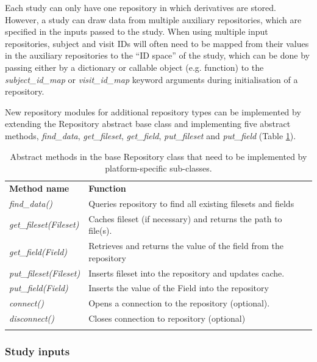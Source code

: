 \documentclass[smallextended]{svjour3}       %
\begin{document}
Each study can only have one repository in which derivatives are stored.
However, a study can draw data from multiple auxiliary repositories,
which are specified in the inputs passed to the study. When using
multiple input repositories, subject and visit IDs will often need to be
mapped from their values in the auxiliary repositories to the ``ID
space'' of the study, which can be done by passing either by a dictionary
or callable object (e.g. function) to the \emph{subject\_id\_map} or
\emph{visit\_id\_map} keyword arguments during initialisation of a repository.

New repository modules for additional repository types can be
implemented by extending the Repository abstract base class and
implementing five abstract methods, \emph{find\_data}, \emph{get\_fileset},
\emph{get\_field}, \emph{put\_fileset} and \emph{put\_field}
(Table \ref{tbl:abstract-repo-methods}).

\begin{table}
\caption{Abstract methods in the base Repository class that
need to be implemented by platform-specific sub-classes.}
\label{tbl:abstract-repo-methods} 
\begin{tabular}{ll}
\hline\noalign{\smallskip}
\textbf{Method name} & \textbf{Function} \\
\noalign{\smallskip}\hline\noalign{\smallskip}
\emph{find\_data()} & Queries repository to find all existing filesets and
fields \\
\emph{get\_fileset(Fileset)} & Caches fileset (if necessary) and returns the path to file(s). \\
\emph{get\_field(Field)} & Retrieves and returns the value of the field from
the repository \\
\emph{put\_fileset(Fileset)} & Inserts fileset into the repository and updates cache. \\
\emph{put\_field(Field)} & Inserts the value of the Field into the repository \\
\emph{connect()} & Opens a connection to the repository (optional). \\
\emph{disconnect()} & Closes connection to repository (optional)\\
\noalign{\smallskip}\hline
\end{tabular}
\end{table}

\subsubsection*{Study inputs}
\label{study-inputs}
\end{document}
